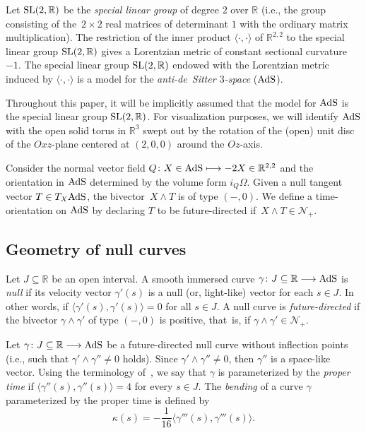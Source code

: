 \documentclass[10pt,a4paper]{amsart}
\numberwithin{equation}{section}
\def\bending{\kappa}
\def\R{\mathbb{R}}
\def\SL{{\rm SL}(2,\R)}
\def\AdS{{\rm AdS}}
\begin{document}
Let $\SL$ be the \emph{special linear group} of degree $2$ over $\R$ (i.e.,
the group consisting of the~${2\times 2}$ real matrices of determinant $1$ with the ordinary matrix multiplication). The restriction of the inner product $\langle\cdot,\cdot\rangle$ of $\R^{2,2}$ to the special linear group $\SL$ gives a Lorentzian metric of constant sectional curvature $-1$. The special linear group $\SL$ endowed with the Lorentzian metric induced by $\langle\cdot,\cdot\rangle$ is a model for the \emph{anti-de~Sitter $3$-space} ($\AdS$).

\begin{Remark}%
Throughout this paper, it will be implicitly assumed that the model for $\AdS$ is the special linear group $\SL$. For visualization purposes, we will identify $\AdS$ with the open solid torus in $\mathbb{R}^3$ swept out by the rotation of the (open) unit disc of the $Oxz$-plane centered at $(2,0,0)$ around the $Oz$-axis.
\end{Remark}

Consider the normal vector field $Q\colon X\in\AdS\longmapsto-2X\in\R^{2,2}$ and the orientation in $\AdS$ determined by the volume form $i_Q\Omega$. Given a null tangent vector $T\in T_X\AdS$, the bivector~${X\wedge T}$ is of type $(-,0)$. We define a time-orientation on $\AdS$ by declaring $T$ to be future-directed if~${X\wedge T\in\mathcal{N}_+}$.

\subsection{Geometry of null curves}

Let $J\subseteq\R$ be an open interval. A smooth immersed curve $\gamma\colon J\subseteq \mathbb{R}\longrightarrow \AdS$ is \emph{null} if its velocity vector $\gamma'(s)$ is a null (or, light-like) vector for each $s\in J$. In other words, if $\langle \gamma'(s),\gamma'(s)\rangle=0$ for all $s\in J$. A null curve is \emph{future-directed} if the bivector $\gamma\wedge\gamma'$ of type $(-,0)$ is positive, that~is, if $\gamma\wedge\gamma'\in\mathcal{N}_+$.

Let $\gamma\colon J\subseteq\R\longrightarrow\AdS$ be a future-directed null curve without inflection points (i.e., such that $\gamma'\wedge\gamma''\neq 0$ holds). Since $\gamma'\wedge\gamma''\neq 0$, then $\gamma''$ is a space-like vector. Using the terminology of~\cite{MP}, we say that $\gamma$ is parameterized by the \emph{proper time} if $\langle \gamma''(s),\gamma''(s)\rangle=4$ for every $s\in J$. The \emph{bending} of a curve $\gamma$ parameterized by the proper time is defined by
\begin{equation*}\bending(s)=-\frac{1}{16}\bigl\langle\gamma'''(s),\gamma'''(s)\bigr\rangle.\end{equation*}
\end{document}
